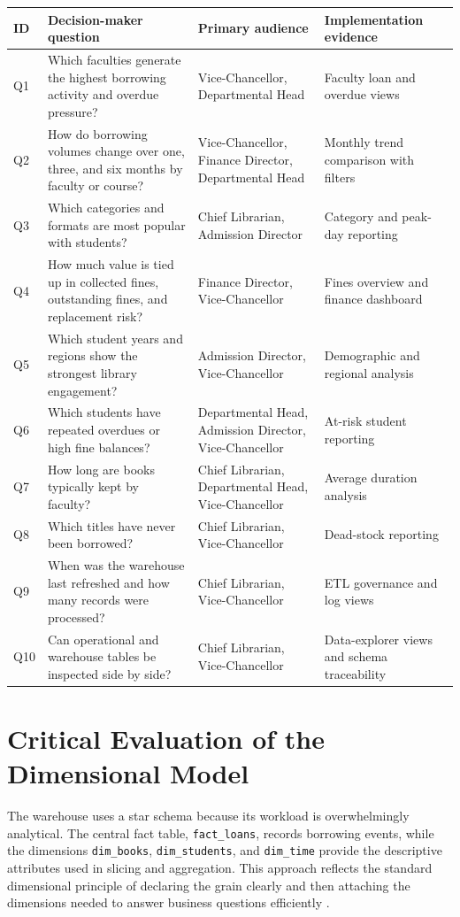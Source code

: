 \documentclass[12pt,a4paper]{article}
\begin{document}
{\small
\renewcommand{\arraystretch}{1.15}
\begin{longtable}{L{0.08\textwidth}L{0.29\textwidth}L{0.24\textwidth}L{0.27\textwidth}}
\toprule
\textbf{ID} & \textbf{Decision-maker question} & \textbf{Primary audience} & \textbf{Implementation evidence} \\
\midrule
Q1 & Which faculties generate the highest borrowing activity and overdue pressure? & Vice-Chancellor, Departmental Head & Faculty loan and overdue views \\
Q2 & How do borrowing volumes change over one, three, and six months by faculty or course? & Vice-Chancellor, Finance Director, Departmental Head & Monthly trend comparison with filters \\
Q3 & Which categories and formats are most popular with students? & Chief Librarian, Admission Director & Category and peak-day reporting \\
Q4 & How much value is tied up in collected fines, outstanding fines, and replacement risk? & Finance Director, Vice-Chancellor & Fines overview and finance dashboard \\
Q5 & Which student years and regions show the strongest library engagement? & Admission Director, Vice-Chancellor & Demographic and regional analysis \\
Q6 & Which students have repeated overdues or high fine balances? & Departmental Head, Admission Director, Vice-Chancellor & At-risk student reporting \\
Q7 & How long are books typically kept by faculty? & Chief Librarian, Departmental Head, Vice-Chancellor & Average duration analysis \\
Q8 & Which titles have never been borrowed? & Chief Librarian, Vice-Chancellor & Dead-stock reporting \\
Q9 & When was the warehouse last refreshed and how many records were processed? & Chief Librarian, Vice-Chancellor & ETL governance and log views \\
Q10 & Can operational and warehouse tables be inspected side by side? & Chief Librarian, Vice-Chancellor & Data-explorer views and schema traceability \\
\bottomrule
\end{longtable}
}

\section{Critical Evaluation of the Dimensional Model}
The warehouse uses a star schema because its workload is overwhelmingly analytical. The central fact table, \texttt{fact\_loans}, records borrowing events, while the dimensions \texttt{dim\_books}, \texttt{dim\_students}, and \texttt{dim\_time} provide the descriptive attributes used in slicing and aggregation. This approach reflects the standard dimensional principle of declaring the grain clearly and then attaching the dimensions needed to answer business questions efficiently \citep{kimball2013}.
\end{document}
